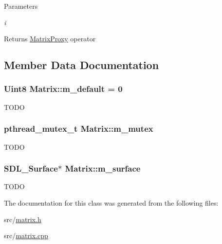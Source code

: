 \begin{DoxyParams}{Parameters}
\item[{\em i}]\end{DoxyParams}
\begin{DoxyReturn}{Returns}
\hyperlink{classMatrix_1_1MatrixProxy}{MatrixProxy} operator 
\end{DoxyReturn}


\subsection{Member Data Documentation}
\hypertarget{classMatrix_a128eca9782b86bae0eed3d1d0967249e}{
\subsubsection[{m\_\-default}]{\setlength{\rightskip}{0pt plus 5cm}Uint8 {\bf Matrix::m\_\-default} = 0}}
\label{classMatrix_a128eca9782b86bae0eed3d1d0967249e}
TODO \hypertarget{classMatrix_aba01078d3f7abfceae9f6ce1913bbdc3}{
\subsubsection[{m\_\-mutex}]{\setlength{\rightskip}{0pt plus 5cm}pthread\_\-mutex\_\-t {\bf Matrix::m\_\-mutex}}}
\label{classMatrix_aba01078d3f7abfceae9f6ce1913bbdc3}
TODO \hypertarget{classMatrix_a76ecc20ed053f699bcf299958be9f4a1}{
\subsubsection[{m\_\-surface}]{\setlength{\rightskip}{0pt plus 5cm}SDL\_\-Surface$\ast$ {\bf Matrix::m\_\-surface}}}
\label{classMatrix_a76ecc20ed053f699bcf299958be9f4a1}
TODO 

The documentation for this class was generated from the following files:\begin{DoxyCompactItemize}
\item 
src/\hyperlink{matrix_8h}{matrix.h}\item 
src/\hyperlink{matrix_8cpp}{matrix.cpp}\end{DoxyCompactItemize}
